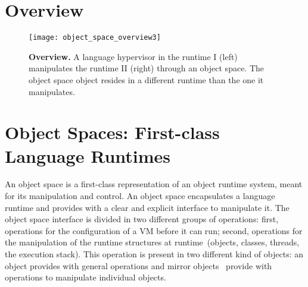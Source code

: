 



\section{\Vtt Overview} \label{sec:virtualization_overview}

\begin{figure}[htb]
\begin{center}
\texttt{[image: object\_space\_overview3]}
\caption{\textbf{\VTT Overview.} A language hypervisor in the runtime I (left) manipulates the runtime II (right) through an object space. The object space object resides in a different runtime than the one it manipulates.\label{fig:objectSpaceOverview}}
\end{center}
\end{figure}

\section{Object Spaces: First-class Language Runtimes} \label{sec:object_space}

An object space is a first-class representation of an object runtime system, meant for its manipulation and control. An object space encapsulates a language runtime and provides with a clear and explicit interface to manipulate it. The object space interface is divided in two different groups of operations: first, operations for the configuration of a VM before it can run; second, operations for the manipulation of the runtime structures at runtime~(objects, classes, threads, the execution stack). This operation is present in two different kind of objects: an  object provides with general operations and mirror objects~\cite{Brac04b} provide with operations to manipulate individual objects.

